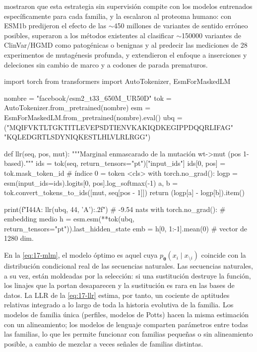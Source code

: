 \textcite{c17-meier2021} mostraron que esta estrategia sin supervisión compite con los modelos entrenados específicamente para cada familia, y \textcite{c17-brandes2023} la escalaron al proteoma humano: con ESM1b predijeron el efecto de las $\sim$450 millones de variantes de sentido erróneo posibles, superaron a los métodos existentes al clasificar $\sim$\num{150000} variantes de ClinVar/HGMD como patogénicas o benignas y al predecir las mediciones de 28 experimentos de mutagénesis profunda, y extendieron el enfoque a inserciones y deleciones sin cambio de marco y a codones de parada prematuros.

\begin{codigo}
import torch
from transformers import AutoTokenizer, EsmForMaskedLM

nombre = "facebook/esm2_t33_650M_UR50D"
tok = AutoTokenizer.from_pretrained(nombre)
esm = EsmForMaskedLM.from_pretrained(nombre).eval()
ubq = ("MQIFVKTLTGKTITLEVEPSDTIENVKAKIQDKEGIPPDQQRLIFAG"
       "KQLEDGRTLSDYNIQKESTLHLVLRLRGG")

def llr(seq, pos, mut):
    """Marginal enmascarado de la mutación wt->mut (pos 1-based)."""
    ids = tok(seq, return_tensors="pt")["input_ids"]
    ids[0, pos] = tok.mask_token_id        # índice 0 = token <cls>
    with torch.no_grad():
        logp = esm(input_ids=ids).logits[0, pos].log_softmax(-1)
    a, b = tok.convert_tokens_to_ids([mut, seq[pos - 1]])
    return (logp[a] - logp[b]).item()

print(f"I44A: {llr(ubq, 44, 'A'):.2f}")      # -9.54 nats
with torch.no_grad():                      # embedding medio
    h = esm.esm(**tok(ubq, return_tensors="pt")).last_hidden_state
emb = h[0, 1:-1].mean(0)                   # vector de 1280 dim.
\end{codigo}

\begin{profundizacion}
En la \cref{eq:17-mlm}, el modelo óptimo es aquel cuya $p_{\boldsymbol\theta}(x_i\mid x_{\setminus i})$ coincide con la distribución condicional real de las secuencias naturales. Las secuencias naturales, a su vez, están moldeadas por la selección: si una sustitución destruye la función, los linajes que la portan desaparecen y la sustitución es rara en las bases de datos. La LLR de la \cref{eq:17-llr} estima, por tanto, un cociente de aptitudes relativas integrado a lo largo de toda la historia evolutiva de la familia. Los modelos de familia única (perfiles, modelos de Potts) hacen la misma estimación con un alineamiento; los modelos de lenguaje comparten parámetros entre todas las familias, lo que les permite funcionar con familias pequeñas o sin alineamiento posible, a cambio de mezclar a veces señales de familias distintas.
\end{profundizacion}

